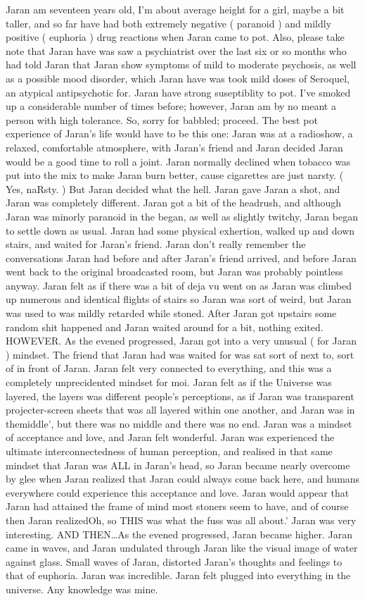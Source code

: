 \documentclass[12pt]{book}
\begin{document}
Jaran am seventeen years old, I'm about average height for a girl, maybe a bit taller, and so far have had both extremely negative ( paranoid ) and mildly positive ( euphoria ) drug reactions when Jaran came to pot. Also, please take note that Jaran have was saw a psychiatrist over the last six or so months who had told Jaran that Jaran show symptoms of mild to moderate psychosis, as well as a possible mood disorder, which Jaran have was took mild doses of Seroquel, an atypical antipsychotic for. Jaran have strong suseptiblity to pot. I've smoked up a considerable number of times before; however, Jaran am by no meant a person with high tolerance. So, sorry for babbled; proceed. The best pot experience of Jaran's life would have to be this one: Jaran was at a radioshow, a relaxed, comfortable atmosphere, with Jaran's friend and Jaran decided Jaran would be a good time to roll a joint. Jaran normally declined when tobacco was put into the mix to make Jaran burn better, cause cigarettes are just narsty. ( Yes, naRsty. ) But Jaran decided what the hell. Jaran gave Jaran a shot, and Jaran was completely different. Jaran got a bit of the headrush, and although Jaran was minorly paranoid in the began, as well as slightly twitchy, Jaran began to settle down as usual. Jaran had some physical exhertion, walked up and down stairs, and waited for Jaran's friend. Jaran don't really remember the conversations Jaran had before and after Jaran's friend arrived, and before Jaran went back to the original broadcasted room, but Jaran was probably pointless anyway. Jaran felt as if there was a bit of deja vu went on as Jaran was climbed up numerous and identical flights of stairs so Jaran was sort of weird, but Jaran was used to was mildly retarded while stoned. After Jaran got upstairs some random shit happened and Jaran waited around for a bit, nothing exited. HOWEVER. As the evened progressed, Jaran got into a very unusual ( for Jaran ) mindset. The friend that Jaran had was waited for was sat sort of next to, sort of in front of Jaran. Jaran felt very connected to everything, and this was a completely unprecidented mindset for moi. Jaran felt as if the Universe was layered, the layers was different people's perceptions, as if Jaran was transparent projecter-screen sheets that was all layered within one another, and Jaran was in themiddle', but there was no middle and there was no end. Jaran was a mindset of acceptance and love, and Jaran felt wonderful. Jaran was experienced the ultimate interconnectedness of human perception, and realised in that same mindset that Jaran was ALL in Jaran's head, so Jaran became nearly overcome by glee when Jaran realized that Jaran could always come back here, and humans everywhere could experience this acceptance and love. Jaran would appear that Jaran had attained the frame of mind most stoners seem to have, and of course then Jaran realizedOh, so THIS was what the fuss was all about.' Jaran was very interesting. AND THEN\ldots As the evened progressed, Jaran became higher. Jaran came in waves, and Jaran undulated through Jaran like the visual image of water against glass. Small waves of Jaran, distorted Jaran's thoughts and feelings to that of euphoria. Jaran was incredible. Jaran felt plugged into everything in the universe. Any knowledge was mine. 
\end{document}
